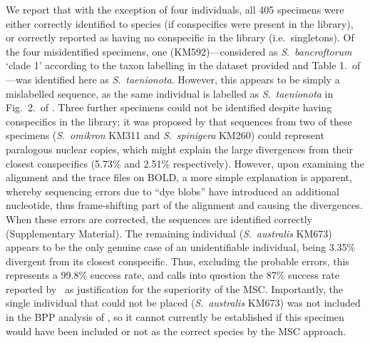\documentclass[12pt]{article}
\begin{document}
We report that with the exception of four individuals, all 405 specimens were either correctly identified to species (if conspecifics were present in the library), or correctly reported as having no conspecific in the library (i.e.\ singletons).  Of the four misidentified specimens, one (KM592)---considered as \emph{S}.\ \emph{bancroftorum} `clade 1' according to the taxon labelling in the dataset provided and Table 1.\ of \citeauthor{Dowton2014}---was identified here as \emph{S}.\ \emph{taenionota}. However, this appears to be simply a mislabelled sequence, as the same individual is labelled as  \emph{S}.\ \emph{taenionota} in Fig.\ 2.\ of \citet{Meiklejohn2013}. Three further specimens could not be identified despite having conspecifics in the library; it was proposed by \citet{Meiklejohn2012} that sequences from two of these specimens (\emph{S}.\ \emph{omikron} KM311 and  \emph{S}.\ \emph{spinigera} KM260) could represent paralogous nuclear copies, which might explain the large divergences from their closest conspecifics (5.73\% and 2.51\% respectively). However, upon examining the alignment and the trace files on BOLD, a more simple explanation is apparent, whereby sequencing errors due to ``dye blobs'' have introduced an additional nucleotide, thus frame-shifting part of the alignment and causing the divergences. When these errors are corrected, the sequences are identified correctly (Supplementary Material).  The remaining individual (\emph{S}.\ \emph{australis} KM673) appears to be the only genuine case of an unidentifiable individual, being 3.35\% divergent from its closest conspecific. Thus, excluding the probable errors, this represents a 99.8\% success rate, and calls into question the 87\% success rate reported by \citeauthor{Dowton2014}\ as justification for the superiority of the MSC. Importantly, the single individual that could not be placed (\emph{S}.\ \emph{australis} KM673) was not included in the BPP analysis of \citeauthor{Dowton2014}, so it cannot currently be established if this specimen would have been included or not as the correct species by the MSC approach. 
\end{document}
